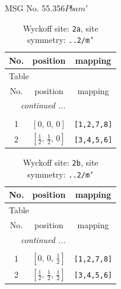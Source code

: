 \documentclass[fleqn,8pt]{jsarticle}
\begin{document}
\setcounter{MaxMatrixCols}{32}

\renewcommand{\tablename}{Table~}
\renewcommand{\figurename}{Figure~}
\begin{center}
\LARGE
MSG No. 55.356\quad$Pbam'$
\end{center}
\renewcommand{\arraystretch}{1.2}
\begin{longtable}{ccc}
\caption{Wyckoff site: {\tt 2a}, site symmetry: {\tt ..2/m'}}
 \\
 \hline \hline
No. & position & mapping \\ \hline \endfirsthead

\multicolumn{2}{l}{\tablename\ \thetable{}} \\
 \hline \hline
No. & position & mapping \\ \hline \endhead

 \hline \hline
\multicolumn{2}{r}{\footnotesize\it continued ...} \\ \endfoot

 \hline \hline
\multicolumn{2}{r}{} \\ \endlastfoot

1 & $\left[ 0,\, 0,\, 0 \right]$ & {\tt [1,2,7,8]} \\ \hline
2 & $\left[ \frac{1}{2},\, \frac{1}{2},\, 0 \right]$ & {\tt [3,4,5,6]} \\
\end{longtable}
\renewcommand{\arraystretch}{1.2}
\begin{longtable}{ccc}
\caption{Wyckoff site: {\tt 2b}, site symmetry: {\tt ..2/m'}}
 \\
 \hline \hline
No. & position & mapping \\ \hline \endfirsthead

\multicolumn{2}{l}{\tablename\ \thetable{}} \\
 \hline \hline
No. & position & mapping \\ \hline \endhead

 \hline \hline
\multicolumn{2}{r}{\footnotesize\it continued ...} \\ \endfoot

 \hline \hline
\multicolumn{2}{r}{} \\ \endlastfoot

1 & $\left[ 0,\, 0,\, \frac{1}{2} \right]$ & {\tt [1,2,7,8]} \\ \hline
2 & $\left[ \frac{1}{2},\, \frac{1}{2},\, \frac{1}{2} \right]$ & {\tt [3,4,5,6]} \\
\end{longtable}
\end{document}
